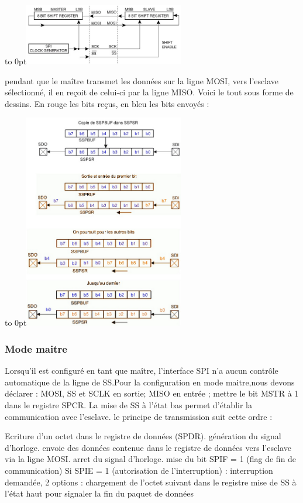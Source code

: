 \documentclass[french,a4paper,12pt]{report}
\begin{document}
\hfill\hbox to 0pt{\hss\includegraphics[width=7cm]{SPI3.png}\hss}\hfill\null\newline

pendant que le maître transmet les données sur la ligne MOSI, vers l’esclave sélectionné, il en reçoit de celui-ci par la ligne MISO.
Voici le tout sous forme de dessins. En rouge les bits reçus, en bleu les bits envoyés :

\hfill\hbox to 0pt{\hss\includegraphics[width=7cm]{SPI4.png}\hss}\hfill\null\newline

  \subsubsection{Mode maitre}
Lorsqu'il est configuré en tant que maître, l'interface SPI n'a aucun contrôle automatique de la ligne de SS.Pour la configuration en mode maitre,nous devons déclarer : MOSI, SS et SCLK en sortie; MISO en entrée ; mettre le bit MSTR à 1 dans le registre SPCR. La mise de SS à l’état bas permet
d'établir la communication avec l’esclave.
le principe de transmission suit cette ordre :

    Ecriture d’un octet dans le registre de données (SPDR).
    génération du signal d'horloge.
    envoie des données contenue dans le registre de données vers l’esclave via la ligne MOSI.
    arret du signal d'horloge.
    mise du bit SPIF = 1 (flag de fin de communication)
    Si SPIE = 1 (autorisation de l’interruption) : interruption demandée, 2 options :
        chargement de l’octet suivant dans le registre
        mise de SS à l’état haut pour signaler la fin du paquet de données
\end{document}
